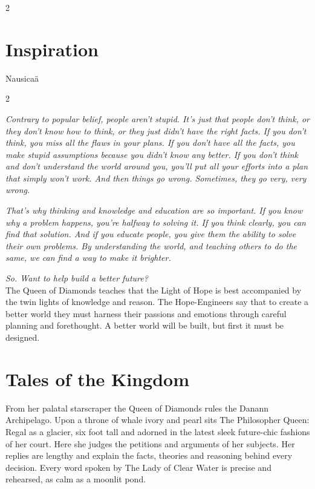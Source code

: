 \begin{multicols}{2}
\section*{Inspiration}

Nausica\"{a}

\end{multicols}
\label{scha:Diamonds}\begin{multicols}{2}\raggedcolumns

\noindent\textit{Contrary to popular belief, people aren't stupid. It's just that people don't think, or they don't know how to think, or they just didn't have the right facts. If you don't think, you miss all the flaws in your plans. If you don't have all the facts, you make stupid assumptions because you didn't know any better. If you don't think and don't understand the world around you, you'll put all your efforts into a plan that simply won't work. And then things go wrong. Sometimes, they go very, very wrong.}

\textit{That's why thinking and knowledge and education are so important. If you know why a problem happens, you're halfway to solving it. If you think clearly, you can find that solution. And if you educate people, you give them the ability to solve their own problems. By understanding the world, and teaching others to do the same, we can find a way to make it brighter.}

\textit{So. Want to help build a better future?}\\

\noindent The Queen of Diamonds teaches that the Light of Hope is best accompanied by the twin lights of knowledge and reason. The Hope-Engineers say that to create a better world they must harness their passions and emotions through careful planning and forethought. A better world will be built, but first it must be designed. 

\section*{Tales of the Kingdom}

From her palatal starscraper the Queen of Diamonds rules the Danann Archipelago. Upon a throne of whale ivory and pearl sits The Philosopher Queen: Regal as a glacier, six foot tall and adorned in the latest sleek future-chic fashions of her court. Here she judges the petitions and arguments of her subjects. Her replies are lengthy and explain the facts, theories and reasoning behind every decision. Every word spoken by The Lady of Clear Water is precise and rehearsed, as calm as a moonlit pond.


\end{multicols}
